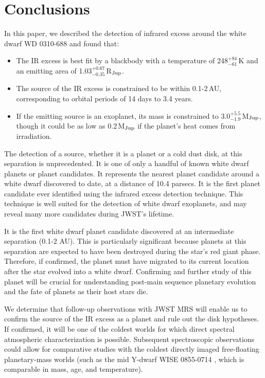 \documentclass[twocolumn]{aastex631}
\begin{document}
 





\section{Conclusions} \label{sec:conclude}
 
In this paper, we described the detection of infrared excess around the white dwarf WD 0310-688 and found that:
\begin{itemize}
\item The IR excess is best fit by a blackbody with a temperature of 248$^{+84}_{-61}$\,K and an emitting area of 1.03$^{+0.67}_{-0.35}$\,R$_{\rm Jup}$.
\item The source of the IR excess is constrained to be within 0.1-2\,AU, corresponding to orbital periods of 14 days to 3.4 years.
\item If the emitting source is an exoplanet, its mass is constrained to $3.0^{+5.5}_{-1.9}$\,M$_{\rm Jup}$, though it could be as low as 0.2\,M$_{\rm Jup}$ if the planet's heat comes from irradiation.
\end{itemize}

The detection of a source, whether it is a planet or a cold dust disk, at this separation is unprecedented. It is one of only a handful of known white dwarf planets or planet candidates. It represents the nearest planet candidate around a white dwarf discovered to date, at a distance of 10.4 parsecs. It is the first planet candidate ever identified using the infrared excess detection technique. This technique is well suited for the detection of white dwarf exoplanets, and may reveal many more candidates during JWST's lifetime.

It is the first white dwarf planet candidate discovered at an intermediate separation (0.1-2 AU). This is particularly significant because planets at this separation are expected to have been destroyed during the star’s red giant phase. Therefore, if confirmed, the planet must have migrated to its current location after the star evolved into a white dwarf. Confirming and further study of this planet will be crucial for understanding post-main sequence planetary evolution and the fate of planets as their host stars die.

We determine that follow-up observations with JWST MRS will enable us to confirm the source of the IR excess as a planet and rule out the disk hypotheses. If confirmed, it will be one of the coldest worlds for which direct spectral atmospheric characterization is possible. Subsequent spectroscopic observations could allow for comparative studies with the coldest directly imaged free-floating planetary-mass worlds (such as the mid Y-dwarf WISE 0855-0714 \citep{2024AJ....167....5L}, which is comparable in mass, age, and temperature).
\end{document}
